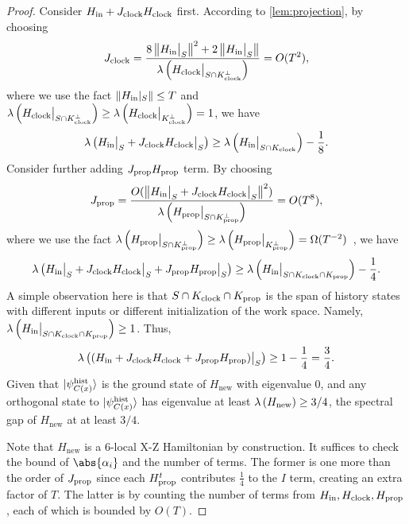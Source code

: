 \begin{proof}
Consider $H_{\mathrm{in}} + J_{\mathrm{clock}}H_{\mathrm{clock}}$ first. According to \cref{lem:projection}, by choosing
\[
  J_{\mathrm{clock}} = \frac{8\left\lVert H_{\mathrm{in}}\big|_S\right\rVert^2 + 2 \left\lVert H_{\mathrm{in}}\big|_S\right\rVert}{{\lambda \left (H_{\mathrm{clock}}\big|_{S\cap K_{\mathrm{clock}}^\bot} \right)}} = O(T^2),
\]
where we use the fact $\left\lVert H_{\mathrm{in}}|_S\right\rVert\leq T$ and ${\lambda \left (H_{\mathrm{clock}}\big|_{S\cap K_{\mathrm{clock}}^\bot} \right)}\geq {\lambda \left (H_{\mathrm{clock}}\big|_{K_{\mathrm{clock}}^\bot} \right)}=1$,
we have
\[
 {\lambda \left (H_{\mathrm{in}}\big|_S + J_{\mathrm{clock}}H_{\mathrm{clock}}\big|_S \right)}\geq {\lambda \left (H_{\mathrm{in}}\big|_{S\cap K_{\mathrm{clock}}} \right)} - \frac{1}{8}.
\]
Consider further adding $J_{\mathrm{prop}}H_{\mathrm{prop}}$ term.  By choosing
\[
 J_{\mathrm{prop}}= \frac{O(\left\lVert H_{\mathrm{in}}\big|_S + J_{\mathrm{clock}}H_{\mathrm{clock}}\big|_S\right\rVert^2)}{{\lambda \left (H_{\mathrm{prop}}\big|_{S \cap K_{\mathrm{prop}}^\bot} \right)}}= O(T^8),
\]
where we use the fact ${\lambda \left (H_{\mathrm{prop}}\big|_{S\cap K_{\mathrm{prop}}^\bot} \right)}\geq {\lambda \left (H_{\mathrm{prop}}\big|_{K_{\mathrm{prop}}^\bot} \right)}=\Omega(T^{-2})$~\cite{kitaev2002classical}, we have  
\[
 {\lambda \left (H_{\mathrm{in}}\big|_S + J_{\mathrm{clock}}H_{\mathrm{clock}}\big|_S + J_{\mathrm{prop}}H_{\mathrm{prop}}\big|_S \right)} \geq {\lambda \left (H_{\mathrm{in}}\big|_{S \cap K_{\mathrm{clock}}\cap K_{\mathrm{prop}}} \right)} - \frac{1}{4}.
\]
A simple observation here is that $S \cap K_{\mathrm{clock}} \cap K_{\mathrm{prop}}$ is the span of history states with different inputs or different initialization of the work space. Namely, ${\lambda \left (H_{\mathrm{in}}\big|_{S \cap K_{\mathrm{clock}} \cap K_{\mathrm{prop}}} \right)} \geq 1$. Thus,
\[
  {\lambda \left ((H_{\mathrm{in}} + J_{\mathrm{clock}}H_{\mathrm{clock}} + J_{\mathrm{prop}}H_{\mathrm{prop}})\big|_S \right)} \geq 1- \frac{1}{4}=\frac{3}{4}.
\]
Given that $\ket{\psi_{C(x)}^{\mathrm{hist}}}$ is the ground state of $H_{\mathrm{new}}$ with eigenvalue 0, and any orthogonal state to $\ket{\psi_{C(x)}^{\mathrm{hist}}}$ has eigenvalue at least ${\lambda \left (H_{\mathrm{new}} \right)}\geq 3/4$, the spectral gap of $H_{\mathrm{new}}$ at at least $3/4$.

Note that $H_{\mathrm{new}}$ is a 6-local X-Z Hamiltonian by construction. It suffices to check the bound of $\abs{\alpha_i}$ and the number of terms. The former is one more than the order of $J_{\mathrm{prop}}$ since each $H_{\mathrm{prop}}^t$ contributes $\frac{1}{4}$ to the $I$ term, creating an extra factor of $T$. The latter is by counting the number of terms from $H_{\mathrm{in}}, H_{\mathrm{clock}}, H_{\mathrm{prop}}$, each of which is bounded by $O(T)$.
\end{proof}

